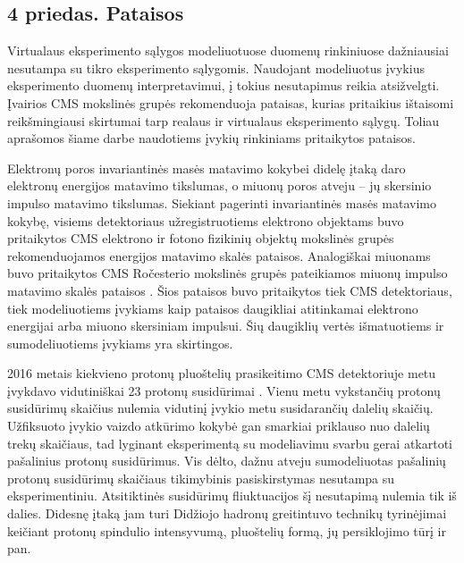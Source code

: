 \documentclass[a4paper, 12pt, oneside]{article}
\begin{document}
\vspace{1cm}
\subsection*{4 priedas. Pataisos}
Virtualaus eksperimento sąlygos modeliuotuose duomenų rinkiniuose dažniausiai nesutampa su tikro eksperimento sąlygomis.
Naudojant modeliuotus įvykius eksperimento duomenų interpretavimui, į tokius nesutapimus reikia atsižvelgti.
Įvairios CMS mokslinės grupės rekomenduoja pataisas, kurias pritaikius ištaisomi reikšmingiausi skirtumai tarp
realaus ir virtualaus eksperimento sąlygų.
Toliau aprašomos šiame darbe naudotiems įvykių rinkiniams pritaikytos pataisos.

Elektronų poros invariantinės masės matavimo kokybei didelę įtaką daro elektronų energijos matavimo tikslumas,
o miuonų poros atveju -- jų skersinio impulso matavimo tikslumas.
Siekiant pagerinti invariantinės masės matavimo kokybę, visiems detektoriaus užregistruotiems elektrono objektams
buvo pritaikytos CMS elektrono ir fotono fizikinių objektų mokslinės grupės rekomenduojamos energijos matavimo
skalės pataisos.
Analogiškai miuonams buvo pritaikytos CMS Ročesterio mokslinės grupės pateikiamos miuonų impulso matavimo skalės
pataisos \cite{RocCorr}.
Šios pataisos buvo pritaikytos tiek CMS detektoriaus, tiek modeliuotiems įvykiams kaip pataisos daugikliai atitinkamai
elektrono energijai arba miuono skersiniam impulsui.
Šių daugiklių vertės išmatuotiems ir sumodeliuotiems įvykiams yra skirtingos.

2016 metais kiekvieno protonų pluoštelių prasikeitimo CMS detektoriuje metu įvykdavo vidutiniškai 23 protonų
susidūrimai \cite{CMSLumi}.
Vienu metu vykstančių protonų susidūrimų skaičius nulemia vidutinį įvykio metu susidarančių dalelių skaičių.
Užfiksuoto įvykio vaizdo atkūrimo kokybė gan smarkiai priklauso nuo dalelių trekų skaičiaus, tad lyginant
eksperimentą su modeliavimu svarbu gerai atkartoti pašalinius protonų susidūrimus.
Vis dėlto, dažnu atveju sumodeliuotas pašalinių protonų susidūrimų skaičiaus tikimybinis pasiskirstymas
nesutampa su eksperimentiniu.
Atsitiktinės susidūrimų fliuktuacijos šį nesutapimą nulemia tik iš dalies.
Didesnę įtaką jam turi Didžiojo hadronų greitintuvo technikų tyrinėjimai keičiant protonų spindulio intensyvumą,
pluoštelių formą, jų persiklojimo tūrį ir pan.
\end{document}
